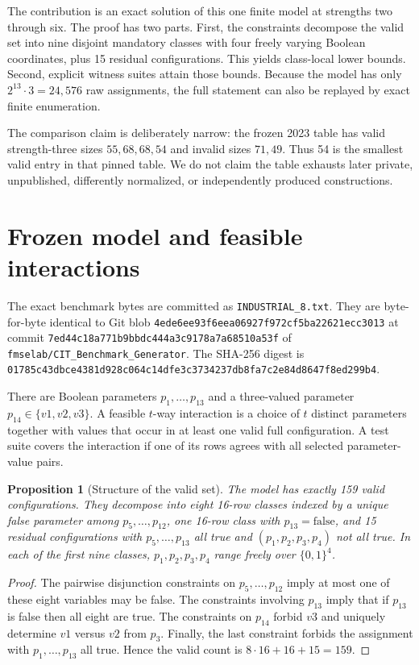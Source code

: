 \documentclass[11pt]{article}
\newtheorem{proposition}[theorem]{Proposition}
\begin{document}
The contribution is an exact solution of this one finite model at strengths
two through six. The proof has two parts. First, the constraints decompose the
valid set into nine disjoint mandatory classes with four freely varying Boolean
coordinates, plus 15 residual configurations. This yields class-local lower
bounds. Second, explicit witness suites attain those bounds. Because the model
has only $2^{13}\cdot3=24{,}576$ raw assignments, the full statement can also
be replayed by exact finite enumeration.

The comparison claim is deliberately narrow: the frozen 2023 table has valid
strength-three sizes $55,68,68,54$ and invalid sizes $71,49$. Thus 54 is the
smallest valid entry in that pinned table. We do not claim the table exhausts
later private, unpublished, differently normalized, or independently produced
constructions.

\section{Frozen model and feasible interactions}
The exact benchmark bytes are committed as \texttt{INDUSTRIAL\_8.txt}. They
are byte-for-byte identical to Git blob
\texttt{4ede6ee93f6eea06927f972cf5ba22621ecc3013} at commit
\texttt{7ed44c18a771b9bbdc444a3c9178a7a68510a53f} of
\texttt{fmselab/CIT\_Benchmark\_Generator}. The SHA-256 digest is
\texttt{01785c43dbce4381d928c064c14dfe3c3734237db8fa7c2e84d8647f8ed299b4}.

There are Boolean parameters $p_1,\ldots,p_{13}$ and a three-valued parameter
$p_{14}\in\{v1,v2,v3\}$. A feasible $t$-way interaction is a choice of $t$
distinct parameters together with values that occur in at least one valid full
configuration. A test suite covers the interaction if one of its rows agrees
with all selected parameter-value pairs.

\begin{proposition}[Structure of the valid set]\label{prop:structure}
The model has exactly 159 valid configurations. They decompose into eight
16-row classes indexed by a unique false parameter among
$p_5,\ldots,p_{12}$, one 16-row class with $p_{13}=\mathrm{false}$, and 15
residual configurations with $p_5,\ldots,p_{13}$ all true and
$(p_1,p_2,p_3,p_4)$ not all true. In each of the first nine classes,
$p_1,p_2,p_3,p_4$ range freely over $\{0,1\}^4$.
\end{proposition}

\begin{proof}
The pairwise disjunction constraints on $p_5,\ldots,p_{12}$ imply at most one
of these eight variables may be false. The constraints involving $p_{13}$
imply that if $p_{13}$ is false then all eight are true. The constraints on
$p_{14}$ forbid $v3$ and uniquely determine $v1$ versus $v2$ from $p_3$.
Finally, the last constraint forbids the assignment with $p_1,\ldots,p_{13}$
all true. Hence the valid count is $8\cdot16+16+15=159$.
\end{proof}
\end{document}
